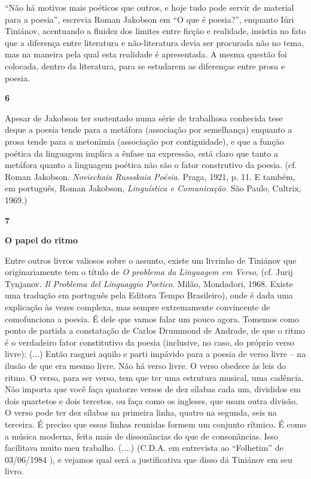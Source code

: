 ``Não há motivos mais poéticos que outros, e hoje tudo pode servir de
material para a poesia'', escrevia Roman Jakobson em ``O que é
poesia?'', enquanto Iúri Tiniánov, acentuando a fluidez dos limites
entre ficção e realidade, insistia no fato que a diferença entre
literatura e não-literatura devia ser procurada não no tema, mas na
maneira pela qual esta realidade é apresentada. A mesma questão foi
colocada, dentro da literatura, para se estudarem as diferenças entre
prosa e poesia.

\textbf{6}

Apesar de Jakobson ter sustentado numa série de trabalhosa conhecida
tese deque a poesia tende para a metáfora (associação por semelhança)
enquanto a prosa tende para a metonímia (associação por contiguidade), e
que a função poética da linguagem implica a ênfase na expressão, está
claro que tanto a metáfora quanto a linguagem poética não são o fator
construtivo da poesia. (cf. Roman Jakobson. \emph{Noviechaia Russskaia
Poésia.} Praga, 1921, p. 11. E também, em português, Roman Jakobson,
\emph{Linguística e Comunicação}. São Paulo, Cultrix, 1969.)

\textbf{7 }

\textbf{O papel do ritmo}

Entre outros livros valiosos sobre o assunto, existe um livrinho de
Tiniánov que originariamente tem o título de \emph{O problema da
Linguagem em Verso}, (cf. Jurij Tynjanov. \emph{Il Problema del
Linguaggio Poetico}. Milão, Mondadori, 1968. Existe uma tradução em
português pela Editora Tempo Brasileiro), onde é dada uma explicação às
vezes complexa, mas sempre extremamente convincente de comofunciona a
poesia. É dele que vamos falar um pouco agora. Tomemos como ponto de
partida a constatação de Carlos Drummond de Andrade, de que o ritmo é o
verdadeiro fator constitutivo da poesia (inclusive, no caso, do próprio
verso livre): (...) Então rasguei aquilo e parti impávido para a poesia
de verso livre -- na ilusão de que era mesmo livre. Não há verso livre.
O verso obedece às leis do ritmo. O verso, para ser verso, tem que ter
uma estrutura musical, uma cadência. Não importa que você faça quatorze
versos de dez sílabas cada um, divididos em dois quartetos e dois
tercetos, ou faça como os ingleses, que usam outra divisão. O verso pode
ter dez sílabas na primeira linha, quatro na segunda, seis na terceira.
É preciso que essas linhas reunidas formem um conjunto rítmico. É como a
música moderna, feita mais de dissonâncias do que de consonâncias. Isso
facilitava muito meu trabalho. (....) (C.D.A. em entrevista ao
``Folhetim'' de 03/06/1984 ), e vejamos qual será a justificativa que
disso dá Tiniánov em seu livro.

